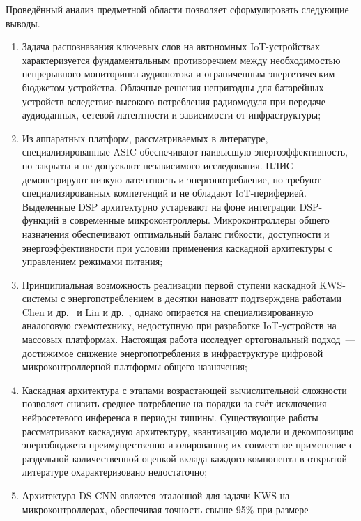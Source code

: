 Проведённый анализ предметной области позволяет сформулировать следующие
выводы.

\begin{enumerate}
	\item Задача распознавания ключевых слов на автономных IoT-устройствах
	      характеризуется фундаментальным противоречием между необходимостью
	      непрерывного мониторинга аудиопотока и ограниченным энергетическим
	      бюджетом устройства. Облачные решения непригодны для батарейных
	      устройств вследствие высокого потребления радиомодуля при передаче
	      аудиоданных, сетевой латентности и зависимости от инфраструктуры;
	\item Из аппаратных платформ, рассматриваемых в литературе,
	      специализированные ASIC обеспечивают наивысшую энергоэффективность,
	      но закрыты и не допускают независимого исследования. ПЛИС
	      демонстрируют низкую латентность и энергопотребление, но требуют
	      специализированных компетенций и не обладают IoT-периферией.
	      Выделенные DSP архитектурно устаревают на фоне интеграции
	      DSP-функций в современные микроконтроллеры. Микроконтроллеры
	      общего назначения обеспечивают оптимальный баланс гибкости,
	      доступности и энергоэффективности при условии применения
	      каскадной архитектуры с управлением режимами питания;
	\item Принципиальная возможность реализации первой ступени каскадной
	      KWS-системы с энергопотреблением в десятки нановатт подтверждена
	      работами Chen и др.~\cite{src:29} и Lin и др.~\cite{src:30},
	      однако опирается на специализированную аналоговую
	      схемотехнику, недоступную при разработке IoT-устройств на массовых
	      платформах. Настоящая работа исследует ортогональный подход~---
	      достижимое снижение энергопотребления в инфраструктуре цифровой
	      микроконтроллерной платформы общего назначения;
	\item Каскадная архитектура с этапами возрастающей вычислительной
	      сложности позволяет снизить среднее потребление на порядки за
	      счёт исключения нейросетевого инференса в периоды тишины.
	      Существующие работы рассматривают каскадную архитектуру,
	      квантизацию модели и декомпозицию энергобюджета преимущественно
	      изолированно; их совместное применение с раздельной
	      количественной оценкой вклада каждого компонента в открытой
	      литературе охарактеризовано недостаточно;
	\item Архитектура DS-CNN является эталонной для задачи KWS на
	      микроконтроллерах, обеспечивая точность свыше 95\% при размере

\end{enumerate}
